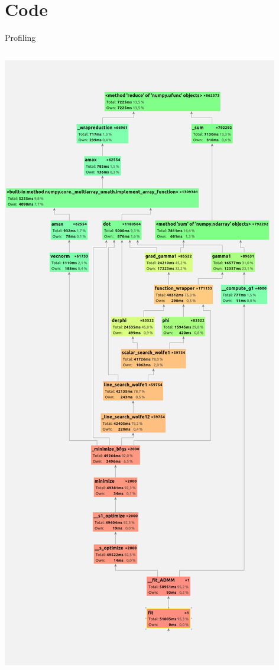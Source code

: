 \documentclass[aspectratio=1610,usenames,dvipsnames]{beamer}
\begin{document}
\section{Code}

\begin{frame}{Profiling}



\begin{columns}
    \begin{column}{0.49\textwidth}
        \begin{center}
            \includegraphics[height=0.88\textheight]{img/profiling2.png}
        \end{center}
    \end{column}
    

\end{columns}
\end{frame}
\end{document}
